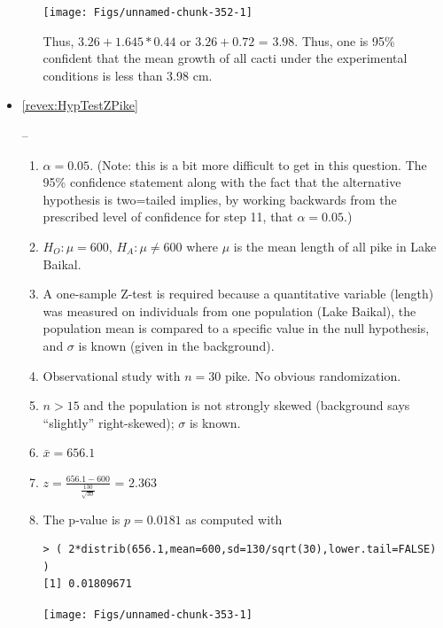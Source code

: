 \documentclass[10pt,openany]{book}\usepackage[]{graphicx}\usepackage[]{color}
\makeatletter
\newenvironment{kframe}{%
 \def\at@end@of@kframe{}%
 \ifinner\ifhmode%
  \def\at@end@of@kframe{\end{minipage}}%
  \begin{minipage}{\columnwidth}%
 \fi\fi%
 \def\FrameCommand##1{\hskip\@totalleftmargin \hskip-\fboxsep
 \colorbox{shadecolor}{##1}\hskip-\fboxsep
     \hskip-\linewidth \hskip-\@totalleftmargin \hskip\columnwidth}%
 \MakeFramed {\advance\hsize-\width
   \@totalleftmargin\z@ \linewidth\hsize
   \@setminipage}}%
 {\par\unskip\endMakeFramed%
 \at@end@of@kframe}
\newenvironment{knitrout}{}{} %
\makeatother
\begin{document}
\begin{itemize}
\begin{enumerate}
\begin{knitrout}
{\centering \texttt{[image: Figs/unnamed-chunk-352-1]} 

}



\end{knitrout}
Thus, $3.26+1.645*0.44$ or $3.26+0.72$ = $3.98$.  Thus, one is 95\% confident that the mean growth of all cacti under the experimental conditions is less than 3.98 cm.
    \end{enumerate}

  \item \hypertarget{ans:HypTestZPike}{\ref{revex:HypTestZPike}} --
    \begin{enumerate}
      \item $\alpha=0.05$. (Note: this is a bit more difficult to get in this question.  The 95\% confidence statement along with the fact that the alternative hypothesis is two=tailed implies, by working backwards from the prescribed level of confidence for step 11, that $\alpha=0.05$.)
      \item $H_{O}:\mu=600$, $H_{A}:\mu\neq600$ where $\mu$ is the mean length of all pike in Lake Baikal.
      \item A one-sample Z-test is required because a quantitative variable (length) was measured on individuals from one population (Lake Baikal), the population mean is compared to a specific value in the null hypothesis, and $\sigma$ is known (given in the background).
      \item Observational study with $n=30$ pike.  No obvious randomization.
      \item $n>15$ and the population is not strongly skewed (background says ``slightly'' right-skewed); $\sigma$ is known.
      \item $\bar{x}=656.1$
      \item $z=\frac{656.1-600}{\frac{130}{\sqrt{30}}}$ = $2.363$
      \item The p-value is $p=0.0181$ as computed with
\begin{knitrout}
\color{fgcolor}\begin{kframe}
\begin{verbatim}
> ( 2*distrib(656.1,mean=600,sd=130/sqrt(30),lower.tail=FALSE) )
[1] 0.01809671
\end{verbatim}
\end{kframe}

{\centering \texttt{[image: Figs/unnamed-chunk-353-1]} 

}




\end{knitrout}
\end{enumerate}
\end{itemize}
\end{document}

